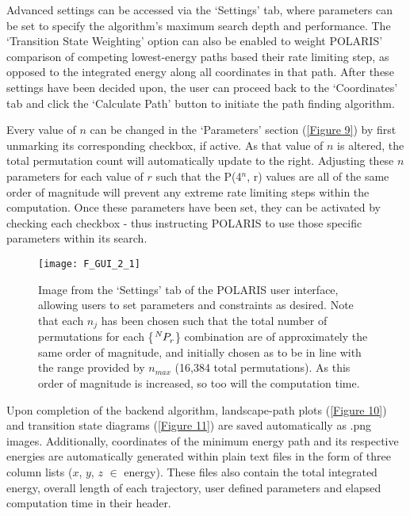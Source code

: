\documentclass[twocolumn]{biophys-new}
\begin{document}
Advanced settings can be accessed via the `Settings' tab, where parameters can be set to specify the algorithm's maximum search depth and performance. The `Transition State Weighting' option can also be enabled to weight POLARIS' comparison of competing lowest-energy paths based their rate limiting step, as opposed to the integrated energy along all coordinates in that path. After these settings have been decided upon, the user can proceed back to the `Coordinates' tab and click the `Calculate Path' button to initiate the path finding algorithm.

Every value of $n$ can be changed in the `Parameters' section (\autoref{Figure 9}) by first unmarking its corresponding checkbox, if active. As that value of $n$ is altered, the total permutation count will automatically update to the right. Adjusting these $n$ parameters for each value of $r$ such that the P(4$^n$, r) values are all of the same order of magnitude will prevent any extreme rate limiting steps within the computation. Once these parameters have been set, they can be activated by checking each checkbox - thus instructing POLARIS to use those specific parameters within its search.

\setcounter{figure}{8} 
\begin{figure}[hbt!]
\centering
\texttt{[image: F\_GUI\_2\_1]}
\caption{Image from the `Settings' tab of the POLARIS user interface, allowing users to set parameters and constraints as desired. Note that each $n_j$ has been chosen such that the total number of permutations for each \{$\tensor*[^{N}_{}]{P}{^{}_r}$\} combination are of approximately the same order of magnitude, and initially chosen as to be in line with the range provided by $n_{max}$ (16,384 total permutations). As this order of magnitude is increased, so too will the computation time.}
\label{Figure 9}
\end{figure}


Upon completion of the backend algorithm, landscape-path plots (\autoref{Figure 10}) and transition state diagrams (\autoref{Figure 11}) are saved automatically as .png images. Additionally, coordinates of the minimum energy path and its respective energies are automatically generated within plain text files in the form of three column lists ($x$, $y$, $z$ $\in$ energy). These files also contain the total integrated energy, overall length of each trajectory, user defined parameters and elapsed computation time in their header.
\end{document}
